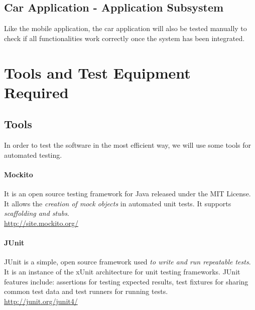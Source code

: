 \documentclass[english]{article}
\begin{document}
\subsection{Car Application - Application Subsystem}

Like the mobile application, the car application will also be tested manually to check if all functionalities work correctly once the system has been integrated.

\newpage
\section{Tools and Test Equipment Required}

\subsection{Tools}


In order to test the software in the most efficient way, we will use some tools for automated testing.

\paragraph{Mockito}
It is an open source testing framework for Java released under the MIT License. It allows the \emph{creation of mock objects} in automated unit tests.
It supports \emph{scaffolding and stubs}.\\
\url{http://site.mockito.org/}

\paragraph{JUnit}
JUnit is a simple, open source framework used \emph{to write and run repeatable tests}. It is an instance of the xUnit architecture for unit testing frameworks. JUnit features include: assertions for testing expected results, test fixtures for sharing common test data and test runners for running tests.\\
\url{http://junit.org/junit4/}
\end{document}
